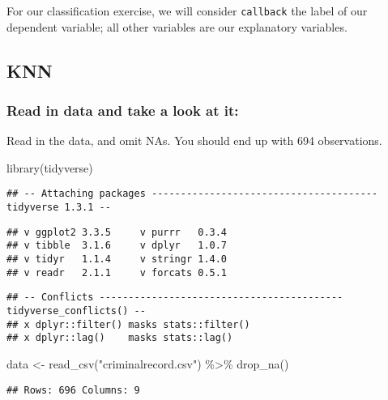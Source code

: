 \documentclass[
]{article}
\newenvironment{Shaded}{\begin{snugshade}}{\end{snugshade}}
\newcommand{\FunctionTok}[1]{\textcolor[rgb]{0.00,0.00,0.00}{#1}}
\newcommand{\NormalTok}[1]{#1}
\newcommand{\OtherTok}[1]{\textcolor[rgb]{0.56,0.35,0.01}{#1}}
\newcommand{\SpecialCharTok}[1]{\textcolor[rgb]{0.00,0.00,0.00}{#1}}
\newcommand{\StringTok}[1]{\textcolor[rgb]{0.31,0.60,0.02}{#1}}
\begin{document}
For our classification exercise, we will consider \texttt{callback} the
label of our dependent variable; all other variables are our explanatory
variables.

\hypertarget{knn}{%
\subsection{KNN}\label{knn}}

\hypertarget{read-in-data-and-take-a-look-at-it}{%
\subsubsection{Read in data and take a look at
it:}\label{read-in-data-and-take-a-look-at-it}}

Read in the data, and omit NAs. You should end up with 694 observations.

\begin{Shaded}
\begin{Highlighting}[]
\FunctionTok{library}\NormalTok{(tidyverse)}
\end{Highlighting}
\end{Shaded}

\begin{verbatim}
## -- Attaching packages --------------------------------------- tidyverse 1.3.1 --
\end{verbatim}

\begin{verbatim}
## v ggplot2 3.3.5     v purrr   0.3.4
## v tibble  3.1.6     v dplyr   1.0.7
## v tidyr   1.1.4     v stringr 1.4.0
## v readr   2.1.1     v forcats 0.5.1
\end{verbatim}

\begin{verbatim}
## -- Conflicts ------------------------------------------ tidyverse_conflicts() --
## x dplyr::filter() masks stats::filter()
## x dplyr::lag()    masks stats::lag()
\end{verbatim}

\begin{Shaded}
\begin{Highlighting}[]
\NormalTok{data }\OtherTok{\textless{}{-}} \FunctionTok{read\_csv}\NormalTok{(}\StringTok{"criminalrecord.csv"}\NormalTok{) }\SpecialCharTok{\%\textgreater{}\%}
  \FunctionTok{drop\_na}\NormalTok{()}
\end{Highlighting}
\end{Shaded}

\begin{verbatim}
## Rows: 696 Columns: 9
\end{verbatim}
\end{document}
